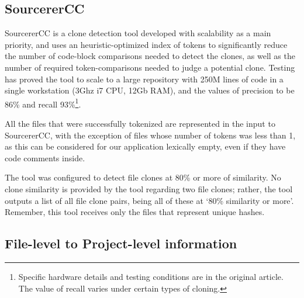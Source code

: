 
\subsection{SourcererCC}

SourcererCC\cite{DBLP:journals/corr/SajnaniSSRL15} is a clone detection tool developed with scalability as a main priority, and uses an heuristic-optimized index of tokens to significantly reduce the number of code-block comparisons needed to detect the clones, as well as the number of required token-comparisons needed to judge a potential clone. Testing has proved the tool to scale to a large repository with 250M lines of code in a single workstation (3Ghz i7 CPU, 12Gb RAM), and the values of precision to be 86\% and recall 93\%\footnote{Specific hardware details and testing conditions are in the original article. The value of recall varies under certain types of cloning.}.


All the files that were successfully tokenized are represented in the input to SourcererCC, with the exception of files whose number of tokens was less than 1, as this can be considered for our application lexically empty, even if they have code comments inside.

The tool was configured to detect file clones at 80\% or more of similarity. No clone similarity is provided by the tool regarding two file clones; rather, the tool outputs a list of all file clone pairs, being all of these at ‘80\% similarity or more’. Remember, this tool receives only the files that represent unique hashes.


\subsection{File-level to Project-level information}

